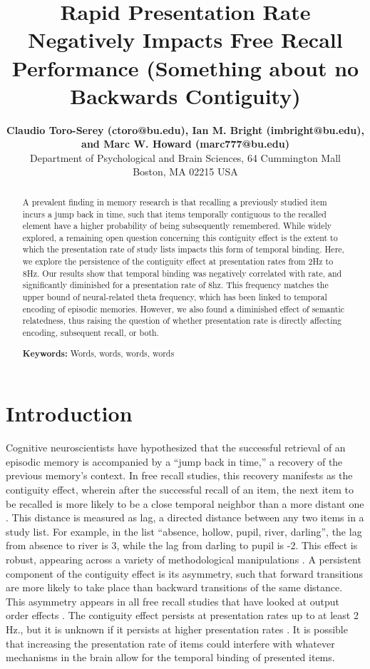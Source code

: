 \documentclass[10pt,letterpaper]{article}
\title{Rapid Presentation Rate Negatively Impacts Free Recall Performance (Something about no Backwards Contiguity)}
\author{{\large \bf Claudio Toro-Serey (ctoro@bu.edu), Ian M. Bright (imbright@bu.edu), and Marc W. Howard (marc777@bu.edu)} \\
  Department of Psychological and Brain Sciences, 64 Cummington Mall\\
  Boston, MA 02215 USA}
\begin{document}
\maketitle


\begin{abstract}
A prevalent finding in memory research is that recalling a previously studied item incurs a jump back in time, such that items temporally contiguous to the recalled element have a higher probability of being subsequently remembered. While widely explored, a remaining open question concerning this contiguity effect is the extent to which the presentation rate of study lists impacts this form of temporal binding. Here, we explore the persistence of the contiguity effect at presentation rates from 2Hz to 8Hz. Our results show that temporal binding was negatively correlated with rate, and significantly diminished for a presentation rate of 8hz. This frequency matches the upper bound of neural-related theta frequency, which has been linked to temporal encoding of episodic memories. However, we also found a diminished effect of semantic relatedness, thus raising the question of whether presentation rate is directly affecting encoding, subsequent recall, or both.

\textbf{Keywords:} 
Words, words, words, words
\end{abstract}

\section{Introduction}

Cognitive neuroscientists have hypothesized that the successful retrieval of an episodic memory is accompanied by a ``jump back in time,'' a recovery of the previous memory's context. \cite{Tulv83}
In free recall studies, this recovery manifests as the contiguity effect, wherein after the successful recall of an item, the next item to be recalled is more likely to be a close temporal neighbor than a more distant one \cite{Kaha96}. 
This distance is measured as lag, a directed distance between any two items in a study list. For example, in the list ``absence, hollow, pupil, river, darling'', the lag from absence to river is 3, while the lag from darling to pupil is -2. 
This effect is robust, appearing across a variety of methodological manipulations \cite{Kaha12}. 
A persistent component of the contiguity effect is its asymmetry, such that forward transitions are more likely to take place than backward transitions of the same distance. 
This asymmetry appears in all free recall studies that have looked at output order effects \cite{KahaEtal08}. 
The contiguity effect persists at presentation rates up to at least 2 Hz., but it is unknown if it persists at higher presentation rates \cite{Kaha96}. 
It is possible that increasing the presentation rate of items could interfere with whatever mechanisms in the brain allow for the temporal binding of presented items. 
\end{document}
